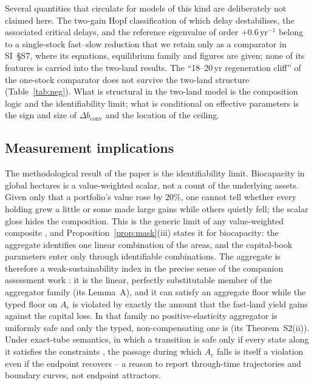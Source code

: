 \documentclass[preprint,12pt,authoryear]{elsarticle}
\newcommand{\dconv}{\Delta b_{\mathrm{conv}}}
\begin{document}
Several quantities that circulate for models of this kind are deliberately not claimed here. The two-gain Hopf classification of which delay destabilises, the associated critical delays, and the reference eigenvalue of order $+0.6\,\mathrm{yr}^{-1}$ belong to a single-stock fast--slow reduction that we retain only as a comparator in SI~\S S7, where its equations, equilibrium family and figures are given; none of its features is carried into the two-land results. The ``18--20\,yr regeneration cliff'' of the one-stock comparator does not survive the two-land structure (Table~\ref{tab:neg}). What is structural in the two-land model is the composition logic and the identifiability limit; what is conditional on effective parameters is the sign and size of $\dconv$ and the location of the ceiling.

\subsection{Measurement implications}

The methodological result of the paper is the identifiability limit. Biocapacity in global hectares is a value-weighted scalar, not a count of the underlying assets. Given only that a portfolio's value rose by $20\%$, one cannot tell whether every holding grew a little or some made large gains while others quietly fell; the scalar gloss hides the composition. This is the generic limit of any value-weighted composite \citep{Nardo2008}, and Proposition~\ref{prop:mask}(iii) states it for biocapacity: the aggregate identifies one linear combination of the areas, and the capital-book parameters enter only through identifiable combinations. The aggregate is therefore a weak-sustainability index in the precise sense of the companion assessment work \citep{Abaee2026b}: it is the linear, perfectly substitutable member of the aggregator family (its Lemma~A), and it can satisfy an aggregate floor while the typed floor on $A_c$ is violated by exactly the amount that the fast-land yield gains against the capital loss. In that family no positive-elasticity aggregator is uniformly safe and only the typed, non-compensating one is (its Theorem~S2(ii)). Under exact-tube semantics, in which a transition is safe only if every state along it satisfies the constraints \citep{Abaee2026b}, the passage during which $A_c$ falls is itself a violation even if the endpoint recovers -- a reason to report through-time trajectories and boundary curves, not endpoint attractors.
\end{document}
